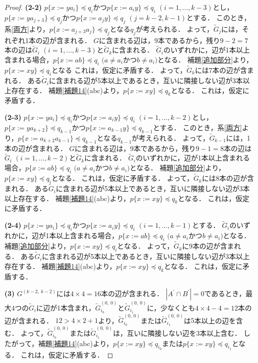 \begin{proof}
\textbf{(2-2)} 
$p \{ x:=ya_{i} \} \preceq q_{i}$かつ$p \{ x:=a_{i}y \} \preceq q_{i}$ $(i=1, \ldots, k-3)$とし，$p \{ x:=ya_{j+3} \} \preceq q_{j}$かつ$p \{ x:=a_{j}y \} \preceq q_{j}$ $(j=k-2,k-1)$とする．
このとき，系\ref{両方}より，$p \{ x:=a_{j+3}a_{j} \} \preceq q_{j}$となる$q_{j}$が考えられる．
よって，$\tilde{G}_{j}$には，それぞれ1本の辺が含まれる．
$G$に含まれる辺は，9本であるから，残り$9-2=7$本の辺は$\tilde{G}_{i}$ $(i=1, \ldots, k-3)$と$\tilde{G}_{k}$に含まれる．
$\tilde{G}_{i}$のいずれかに，辺が1本以上含まれる場合，$p \{ x:=ab \} \preceq q_{i}$ $(a \not = a_{i}$かつ$b \not = a_{i})$となる．
補題\ref{追加部分}より，$p \{ x:=xy \} \preceq q_{i}$となる
これは，仮定に矛盾する．
よって，$\tilde{G}_{k}$には$7$本の辺が含まれる．
ある$\tilde{G}_{i}$に含まれる辺が5本以上であるとき，互いに隣接しない辺が3本以上存在する．
補題\ref{補題14}(abc)より，$p \{x:=xy \} \preceq q_{k}$となる．
これは，仮定に矛盾する．

\textbf{(2-3)} 
$p \{ x:=ya_{i} \} \preceq q_{i}$かつ$p \{ x:=a_{i}y \} \preceq q_{i}$ $(i=1, \ldots, k-2)$とし，$p \{ x:=ya_{k+2} \} \preceq q_{k-1}$かつ$p \{ x:=a_{k-1}y \} \preceq q_{k-1}$とする．
このとき，系\ref{両方}より，$p \{ x:=a_{k+2}a_{k-1} \} \preceq q_{k-1}$となる$q_{k-1}$が考えられる．
よって，$\tilde{G}_{k-1}$には，1本の辺が含まれる．
$G$に含まれる辺は，9本であるから，残り$9-1=8$本の辺は$\tilde{G}_{i}$ $(i=1, \ldots, k-2)$と$\tilde{G}_{k}$に含まれる．
$\tilde{G}_{i}$のいずれかに，辺が1本以上含まれる場合，$p \{ x:=ab \} \preceq q_{i}$ $(a \not = a_{i}$かつ$b \not = a_{i})$となる．
補題\ref{追加部分}より，$p \{ x:=xy \} \preceq q_{i}$となる．
これは，仮定に矛盾する．
よって，$\tilde{G}_{k}$には$8$本の辺が含まれる．
ある$\tilde{G}_{i}$に含まれる辺が5本以上であるとき，互いに隣接しない辺が3本以上存在する．
補題\ref{補題14}(abc)より，$p \{x:=xy \} \preceq q_{k}$となる．
これは，仮定に矛盾する．

\textbf{(2-4)} 
$p \{ x:=ya_{i} \} \preceq q_{i}$かつ$p \{ x:=a_{i}y \} \preceq q_{i}$ $(i=1, \ldots, k-1)$とする．
$\tilde{G}_{i}$のいずれかに，辺が1本以上含まれる場合，$p \{ x:=ab \} \preceq q_{i}$ $(a \not = a_{i}$かつ$b \not = a_{i})$となる．
補題\ref{追加部分}より，$p \{ x:=xy \} \preceq q_{i}$となる．
よって，$\tilde{G}_{k}$に$9$本の辺が含まれる．
ある$\tilde{G}_{i}$に含まれる辺が5本以上であるとき，互いに隣接しない辺が3本以上存在する．
補題\ref{補題14}(abc)より，$p \{x:=xy \} \preceq q_{k}$となる．
これは，仮定に矛盾する．

\noindent\textbf{(3)}
$G^{(k-2,~k-2)}$には$4\times4=16$本の辺が含まれる．
$| A^{\prime} \cap B^{\prime} | = 0$であるとき，最大$4$つの$\tilde{G}_{i}$に辺が1本含まれ，$\tilde{G}^{(0,~0)}_{i_{0}}$と$\tilde{G}^{(0,~0)}_{i_{1}}$に，少なくとも$4 \times 4-4=12$本の辺が含まれる．
$12 > 4 \times 2 + 1$より，$\tilde{G}^{(0,~0)}_{i_{0}}$または$\tilde{G}^{(0,~0)}_{i_{1}}$は$5$本以上の辺を含む．
よって，$\tilde{G}^{(0,~0)}_{i_{0}}$または$\tilde{G}^{(0,~0)}_{i_{1}}$は，互いに隣接しない辺を3本以上含む．
したがって，補題\ref{補題14}(abc)より，$p \{x:=xy \} \preceq q_{i_{0}}$または$p \{x:=xy \} \preceq q_{i_{1}}$となる．
これは，仮定に矛盾する．  


\end{proof}
